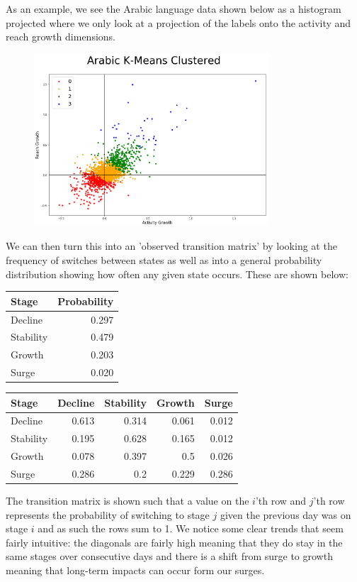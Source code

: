 \documentclass[12pt]{article}
\begin{document}
\FloatBarrier
As an example, we see the Arabic language data shown below as a histogram projected where we only look at a projection of the labels onto the activity and reach growth dimensions.
\FloatBarrier
\begin{figure}[hbtp]\centering
\includegraphics[width=0.78\textwidth,clip]{ArabicKMeans.png}
\end{figure}
\FloatBarrier
We can then turn this into an 'observed transition matrix' by looking at the frequency of switches between states as well as into a general probability distribution showing how often any given state occurs. These are shown below:
\begin{center}
\begin{tabular}{lr}
\toprule
Stage  & Probability \\
\midrule
Decline &  0.297 \\
Stability &  0.479 \\
Growth &  0.203 \\
Surge &  0.020 \\
\bottomrule
\end{tabular}
\quad
\begin{tabular}{lrrrr}
\toprule
Stage & Decline &  Stability & Growth & Surge \\
\midrule
Decline     &  0.613 &  0.314 &  0.061 &  0.012\\
Stability     &  0.195 &  0.628 &  0.165 &  0.012 \\
Growth     &  0.078 &  0.397 &  0.5 &  0.026 \\
Surge     &  0.286 &  0.2 &  0.229 &  0.286\\
\bottomrule
\end{tabular}
\end{center}
\vspace{0.5cm}
The transition matrix is shown such that a value on the $i$'th row and $j$'th row represents the probability of switching to stage $j$ given the previous day was on stage $i$ and as such the rows sum to 1. We notice some clear trends that seem fairly intuitive: the diagonals are fairly high meaning that they do stay in the same stages over consecutive days and there is a shift from surge to growth meaning that long-term impacts can occur form our surges. 
\end{document}
